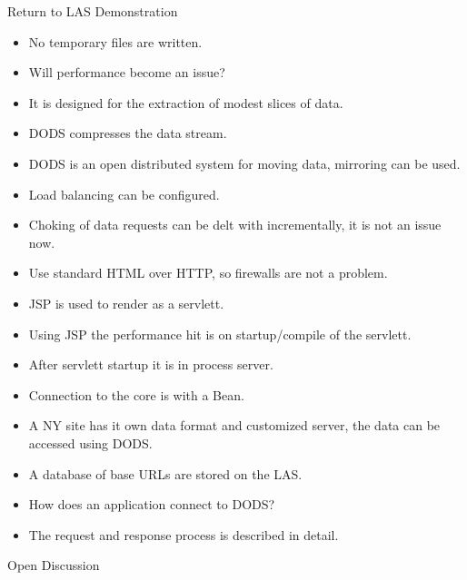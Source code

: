         Return to LAS Demonstration

\begin{itemize}
\item No temporary files are written.
\item Will performance become an issue?
\item It is designed for the extraction of modest slices of data.
\item DODS compresses the data stream.
\item DODS is an open distributed system for moving data, mirroring can be used.
\item Load balancing can be configured.
\item Choking of data requests can be delt with incrementally, it is not an issue now.
\item Use standard HTML over HTTP, so firewalls are not a problem.
\item JSP is used to render as a servlett.
\item Using JSP the performance hit is on startup/compile of the servlett.
\item After servlett startup it is in process server.
\item Connection to the core is with a Bean.
\item A NY site has it own data format and customized server, the data can be accessed using 
DODS.
\item A database of base URLs are stored on the LAS.
\item How does an application connect to DODS?
\item The request and response process is described in detail.
\end{itemize}

        Open Discussion

